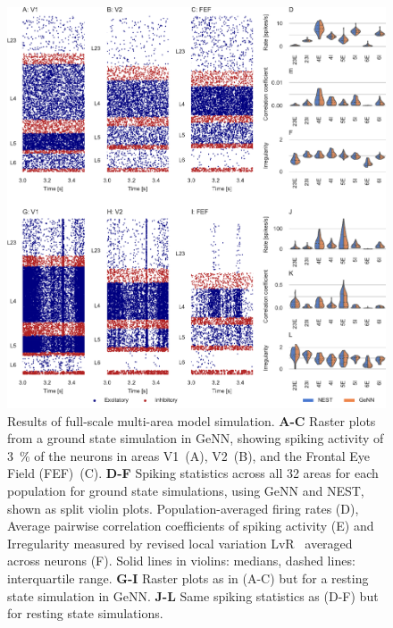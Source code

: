 \documentclass[9pt,a4paper]{amsart}
\newenvironment{fullwidth}{%
  \begin{adjustwidth}{-0.85in}{-0.85in}
}{\end{adjustwidth}}
\begin{document}
\begin{figure}
    \begin{fullwidth}
        \centering
        \includegraphics{figures/multi_area}
        \captionsetup{width=6.69in}
        \caption{Results of full-scale multi-area model simulation. 
        \textbf{A-C} Raster plots from a ground state simulation in GeNN, showing spiking activity of \SI{3}{\percent} of the neurons in areas V1~(A), V2~(B), and the Frontal Eye Field (FEF)~(C).
        \textbf{D-F} Spiking statistics across all 32 areas for each population for ground state simulations, using GeNN and NEST, shown as split violin plots. Population-averaged firing rates (D), Average pairwise correlation coefficients of spiking activity (E) and Irregularity measured by revised local variation LvR~\citep{Shinomoto2009} averaged across neurons (F). Solid lines in violins: medians, dashed lines: interquartile range.
        \textbf{G-I} Raster plots as in (A-C) but for a resting state simulation in GeNN.
        \textbf{J-L} Same spiking statistics as (D-F) but for resting state simulations.}
        \label{fig:multi_area}
    \end{fullwidth}
\end{figure}
%
\end{document}
